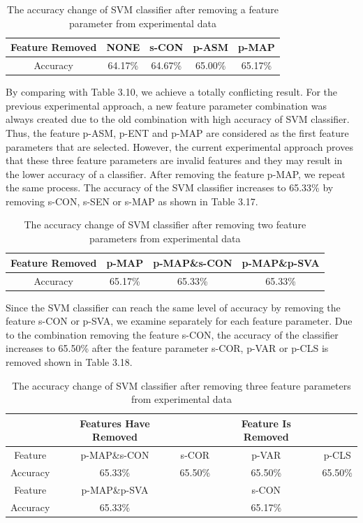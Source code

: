 \begin{table}[!h]
\begin{center}
\renewcommand{\arraystretch}{0.5}
\begin{tabular}{|| c | c | c c c||}
\hline
 Feature Removed & NONE & s-CON & p-ASM & p-MAP  \\
 \hline
 Accuracy & 64.17\% & 64.67\% & 65.00\% & 65.17\% \\
 \hline
\end{tabular}
\end{center}
\caption{The accuracy change of SVM classifier after removing a feature parameter from experimental data}
\end{table}
By comparing with Table 3.10, we achieve a totally conflicting result. For the previous experimental approach, a new feature parameter combination was always created due to the old combination with high accuracy of SVM classifier. Thus, the feature p-ASM, p-ENT and p-MAP are considered as the first feature parameters that are selected. However, the current experimental approach proves that these three feature parameters are invalid features and they may result in the lower accuracy of a classifier. After removing the feature p-MAP, we repeat the same process. The accuracy of the SVM classifier increases to 65.33\% by removing s-CON, s-SEN or s-MAP as shown in Table 3.17.
\begin{table}[!h]
\begin{center}
\renewcommand{\arraystretch}{0.5}
\begin{tabular}{|| c | c | c c ||}
\hline
 Feature Removed & p-MAP & p-MAP\&s-CON & p-MAP\&p-SVA \\
 \hline
 Accuracy & 65.17\% & 65.33\% & 65.33\% \\
 \hline
\end{tabular}
\end{center}
\caption{The accuracy change of SVM classifier after removing two feature parameters from experimental data}
\end{table}
Since the SVM classifier can reach the same level of accuracy by removing the feature s-CON or p-SVA, we examine separately for each feature parameter. Due to the combination removing the feature s-CON, the accuracy of the classifier increases to 65.50\% after the feature parameter s-COR, p-VAR or p-CLS is removed shown in Table 3.18. 
\begin{table}[!h]
\begin{center}
\renewcommand{\arraystretch}{0.5}
\begin{tabular}{|| c | c | c c c||}
\hline
 & Features Have Removed & & Feature Is Removed &\\
\hline
 Feature & p-MAP\&s-CON & s-COR & p-VAR & p-CLS\\
 \hline
 Accuracy & 65.33\% & 65.50\% & 65.50\% & 65.50\% \\
 \hline
 Feature & p-MAP\&p-SVA & & s-CON &\\
 \hline
 Accuracy & 65.33\% & & 65.17\% & \\
 \hline
\end{tabular}
\end{center}
\caption{The accuracy change of SVM classifier after removing three feature parameters from experimental data}
\end{table}
